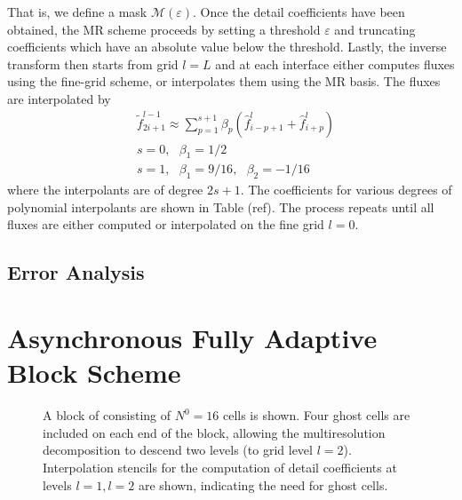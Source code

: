 \documentclass[12pt,letterpaper]{article}
\begin{document}
        That is, we define a mask $\mathcal{M}(\varepsilon)$.
        Once the detail coefficients have been obtained, the MR scheme
        proceeds by setting a threshold $\varepsilon$ and truncating coefficients
        which have an absolute value below the threshold. Lastly, the inverse
        transform then starts from grid $l=L$ and at each interface either
        computes fluxes using the fine-grid scheme, or interpolates them using
        the MR basis. The fluxes are interpolated by
        \begin{align}
            & \tilde{f}_{2i+1}^{l-1} \approx \sum_{p=1}^{s+1} \beta_{p} \left(
            \hat{f}^{l}_{i-p+1} + \hat{f}^{l}_{i+p} \right) \\
            & s=0, \text{ } \beta_{1} = 1/2 \\
            & s=1, \text{ } \beta_{1} = 9/16, \text{ } \beta_{2} = -1/16
        \end{align}
        where the interpolants are of degree $2s+1$. The coefficients for
        various degrees of polynomial interpolants are shown in Table (ref).
        The process repeats until all fluxes are either computed or
        interpolated on the fine grid $l=0$.

    \subsection*{Error Analysis}

\section{Asynchronous Fully Adaptive Block Scheme}


    \begin{figure}[H]
        \center
        
        \caption{A block of consisting of $N^{0} = 16$ cells is shown. Four
        ghost cells are included on each end of the block, allowing the
        multiresolution decomposition to descend two levels (to grid level
        $l=2$). Interpolation stencils for the computation of detail
        coefficients at levels $l=1, l=2$ are shown, indicating the need for ghost cells.}
    \end{figure}
    \begin{figure}[H]
        \center
        
        \caption{}
    \end{figure}
\end{document}

